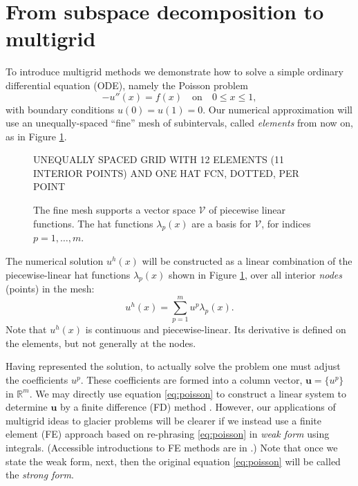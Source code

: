\documentclass[letterpaper,final,12pt,reqno]{amsart}
\newcommand{\RR}{\mathbb{R}}
\newcommand{\bu}{\mathbf{u}}
\begin{document}
\section{From subspace decomposition to multigrid} \label{sec:subspace}

To introduce multigrid methods we demonstrate how to solve a simple ordinary differential equation (ODE), namely the Poisson problem
\begin{equation}
- u''(x) = f(x) \quad \text{on} \quad 0 \le x \le 1, \label{eq:poisson}
\end{equation}
with boundary conditions $u(0)=u(1)=0$.  Our numerical approximation will use an unequally-spaced ``fine'' mesh of subintervals, called \emph{elements} from now on, as in Figure \ref{fig:finehats}.

\begin{figure}
UNEQUALLY SPACED GRID WITH 12 ELEMENTS (11 INTERIOR POINTS) AND ONE HAT FCN, DOTTED, PER POINT
\caption{The fine mesh supports a vector space $\mathcal{V}$ of piecewise linear functions.  The hat functions $\lambda_p(x)$ are a basis for $\mathcal{V}$, for indices $p=1,\dots,m$.}
\label{fig:finehats}
\end{figure}

The numerical solution $u^h(x)$ will be constructed as a linear combination of the piecewise-linear hat functions $\lambda_p(x)$ shown in Figure \ref{fig:finehats}, over all interior \emph{nodes} (points) in the mesh:
\begin{equation}
u^h(x) = \sum_{p=1}^m u^p \lambda_p(x). \label{eq:trialsolution}
\end{equation}
Note that $u^h(x)$ is continuous and piecewise-linear.  Its derivative is defined on the elements, but not generally at the nodes.

Having represented the solution, to actually solve the problem one must adjust the coefficients $u^p$.  These coefficients are formed into a column vector, $\bu=\{u^p\}$ in $\RR^m$.  We may directly use equation \eqref{eq:poisson} to construct a linear system to determine $\bu$ by a finite difference (FD) method \cite{LeVeque2007}.  However, our applications of multigrid ideas to glacier problems will be clearer if we instead use a finite element (FE) approach based on re-phrasing \eqref{eq:poisson} in \emph{weak form} using integrals.  (Accessible introductions to FE methods are in \cite{Bueler2021,Elmanetal2014,Johnson2009}.)  Note that once we state the weak form, next, then the original equation \eqref{eq:poisson} will be called the \emph{strong form}.
\end{document}

